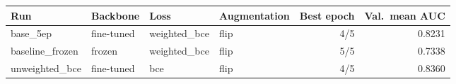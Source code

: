 \begin{tabular}{llllrr}
\toprule
Run & Backbone & Loss & Augmentation & Best epoch & Val.\ mean AUC \\
\midrule
base\_5ep & fine-tuned & weighted\_bce & flip & 4/5 & 0.8231 \\
baseline\_frozen & frozen & weighted\_bce & flip & 5/5 & 0.7338 \\
unweighted\_bce & fine-tuned & bce & flip & 4/5 & 0.8360 \\
\bottomrule
\end{tabular}

